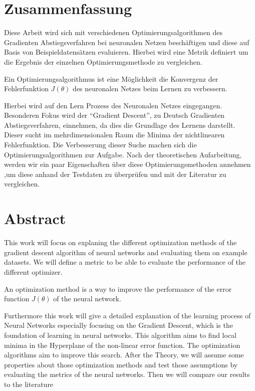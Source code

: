 \section*{Zusammenfassung}

Diese Arbeit wird sich mit verschiedenen 
Optimierungsalgorithmen des Gradienten Abstiegsverfahren bei neuronalen Netzen beschäftigen
und diese auf Basis von Beispieldatensätzen evaluieren.
Hierbei wird eine Metrik definiert um die Ergebnis der einzelnen 
Optimierungsmethode zu vergleichen. 

Ein Optimierungsalgorithmus ist eine Möglichkeit
die Konvergenz der Fehlerfunktion $J(\theta)$ des neuronalen Netzes
beim Lernen zu verbessern. 

Hierbei wird auf den Lern Prozess des Neuronalen
Netzes eingegangen. Besonderen Fokus wird der ``Gradient Descent'',
zu Deutsch Gradienten Abstiegsverfahren, einnehmen, da dies die Grundlage
des Lernens darstellt. Dieser sucht im mehrdimensionalen Raum
die Minima der nichtlinearen Fehlerfunktion. Die Verbesserung 
dieser Suche machen sich die Optimierungsalgorithmen zur Aufgabe.  
Nach der theoretischen Aufarbeitung,
werden wir ein paar Eigenschaften über
diese Optimierungsmethoden annehmen
,um diese anhand der Testdaten zu überprüfen und mit der
Literatur zu vergleichen. 


\section*{Abstract}

This work will focus on explaning the different optimization methods of the gradient descent
algorithm of neural networks and evaluating them
on example datasets.
We will define a metric to be able to evaluate the performance 
of the different optimizer.

An optimization method is a way to improve the performance of the error 
function $J(\theta)$ of the neural network. 


Furthermore this work will give a detailed explanation of the learning process of Neural Networks
especially focusing on the Gradient Descent, which is the foundation of learning in neural networks.
This algorithm aims to find local minima in the Hyperplane of the non-linear error function. 
The optimization algorithms aim to improve this search. 
After the Theory, we will assume some properties about those optimization methods and test those assumptions
by evaluating the metrics of the neural networks. Then we will compare our results to
the literature
